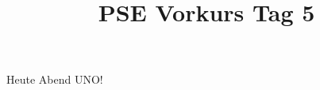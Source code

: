 \documentclass{../../sheet}
\title{PSE Vorkurs Tag 5}
\begin{document}
\maketitle
Heute Abend UNO!


\newpage

\end{document}
